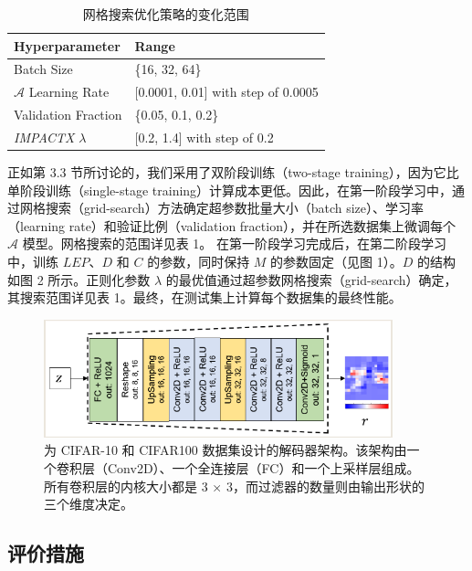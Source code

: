 \documentclass[12pt, a4paper]{ctexart} %
\begin{document}
\begin{table}[h]
  \centering
  \caption{网格搜索优化策略的变化范围}
  \label{tab:grid_search}
  \begin{tabular}{|l|l|}
      \hline
      \textbf{Hyperparameter} & \textbf{Range} \\ \hline
      Batch Size & \{16, 32, 64\} \\ \hline
      \(\mathcal{A}\) Learning Rate & [0.0001, 0.01] with step of 0.0005 \\ \hline
      Validation Fraction & \{0.05, 0.1, 0.2\} \\ \hline
      \textit{IMPACTX} \(\lambda\) & [0.2, 1.4] with step of 0.2 \\ \hline
  \end{tabular}
\end{table}

正如第 3.3 节所讨论的，我们采用了双阶段训练（two-stage training），因为它比单阶段训练（single-stage training）计算成本更低。因此，在第一阶段学习中，通过网格搜索（grid-search）方法确定超参数批量大小（batch size）、学习率（learning rate）和验证比例（validation fraction），并在所选数据集上微调每个 \( \mathcal{A} \) 模型。网格搜索的范围详见表 1。
在第一阶段学习完成后，在第二阶段学习中，训练 \( LEP \)、\( D \) 和 \( C \) 的参数，同时保持 \( M \) 的参数固定（见图 1）。\( D \) 的结构如图 2 所示。正则化参数 \( \lambda \) 的最优值通过超参数网格搜索（grid-search）确定，其搜索范围详见表 1。最终，在测试集上计算每个数据集的最终性能。

\begin{figure}[H]
  \centering
  \includegraphics[width=0.9\textwidth]{img/IMPACTX_2.png}
  \caption{为 CIFAR-10 和 CIFAR100 数据集设计的解码器架构。该架构由一个卷积层（Conv2D）、一个全连接层（FC）和一个上采样层组成。所有卷积层的内核大小都是 3 × 3，而过滤器的数量则由输出形状的三个维度决定。}
\end{figure}

\subsection{评价措施}
\end{document}
